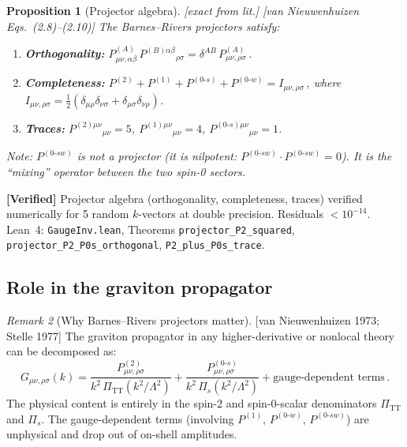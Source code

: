 \documentclass[12pt,a4paper]{article}
\newtheorem{proposition}{Proposition}[section]
\theoremstyle{definition}
\theoremstyle{remark}
\newtheorem{remark}[proposition]{Remark}
\newcommand{\fromlit}[1]{\textcolor{blue!70!black}{\textsf{[#1]}}}
\newcommand{\exactlit}{\textcolor{blue!60!black}{\textsf{[exact from lit.]}}}
\newcommand{\verified}[1]{%
  \par\smallskip\noindent
  \colorbox{green!10}{\parbox{\dimexpr\linewidth-2\fboxsep}{%
    \textcolor{green!50!black}{\textbf{[Verified]}} #1}}%
  \par\smallskip}
\begin{document}
\begin{proposition}[Projector algebra]
\label{prop:projector-algebra}
\exactlit\;
\fromlit{van Nieuwenhuizen Eqs.~(2.8)--(2.10)}
The Barnes--Rivers projectors satisfy:
\begin{enumerate}[nosep]
  \item \textbf{Orthogonality:}
    $P^{(A)}_{\mu\nu,\alpha\beta}\,P^{(B)\alpha\beta}{}_{\rho\sigma}
    = \delta^{AB}\,P^{(A)}_{\mu\nu,\rho\sigma}$\,.
  \item \textbf{Completeness:}
    $P^{(2)} + P^{(1)} + P^{(0\text{-}s)} + P^{(0\text{-}w)}
    = I_{\mu\nu,\rho\sigma}$\,,
    where $I_{\mu\nu,\rho\sigma} = \frac{1}{2}(\delta_{\mu\rho}
    \delta_{\nu\sigma} + \delta_{\mu\sigma}\delta_{\nu\rho})$.
  \item \textbf{Traces:}
    $P^{(2)\mu\nu}{}_{\mu\nu} = 5$,
    $P^{(1)\mu\nu}{}_{\mu\nu} = 4$,
    $P^{(0\text{-}s)\mu\nu}{}_{\mu\nu} = 1$.
\end{enumerate}
Note: $P^{(0\text{-}sw)}$ is \emph{not} a projector (it is
nilpotent: $P^{(0\text{-}sw)}\cdot P^{(0\text{-}sw)} = 0$).
It is the ``mixing'' operator between the two spin-0 sectors.
\end{proposition}

\verified{Projector algebra (orthogonality, completeness, traces)
verified numerically for 5 random $k$-vectors at double precision.
Residuals $< 10^{-14}$.  Lean~4: \texttt{GaugeInv.lean},
Theorems \texttt{projector\_P2\_squared},
\texttt{projector\_P2\_P0s\_orthogonal},
\texttt{P2\_plus\_P0s\_trace}.}


\subsection{Role in the graviton propagator}

\begin{remark}[Why Barnes--Rivers projectors matter]
\fromlit{van Nieuwenhuizen 1973; Stelle 1977}
The graviton propagator in any higher-derivative or nonlocal theory
can be decomposed as:
\begin{equation}
  G_{\mu\nu,\rho\sigma}(k) = \frac{P^{(2)}_{\mu\nu,\rho\sigma}}{
    k^2\,\Pi_{\text{TT}}(k^2/\Lambda^2)}
  + \frac{P^{(0\text{-}s)}_{\mu\nu,\rho\sigma}}{
    k^2\,\Pi_s(k^2/\Lambda^2)}
  + \text{gauge-dependent terms}\,.
  \label{eq:propagator-decomposition}
\end{equation}
The physical content is entirely in the spin-2 and spin-0-scalar
denominators $\Pi_{\text{TT}}$ and $\Pi_s$.  The gauge-dependent
terms (involving $P^{(1)}$, $P^{(0\text{-}w)}$, $P^{(0\text{-}sw)}$)
are unphysical and drop out of on-shell amplitudes.
\end{remark}
\end{document}
